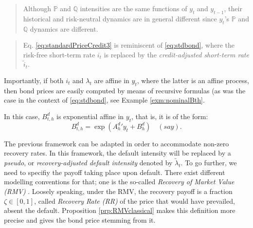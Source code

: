 \documentclass[
  12pt,
]{book}
\theoremstyle{definition}
\theoremstyle{definition}
\theoremstyle{definition}
\theoremstyle{definition}
\theoremstyle{remark}
\begin{document}
\begin{quote}
Although \(\mathbb{P}\) and \(\mathbb{Q}\) intensities are the same functions of \(y_t\) and \(y_{t-1}\), their historical and risk-neutral dynamics are in general different since \(y_t\)'s \(\mathbb{P}\) and \(\mathbb{Q}\) dynamics are different.
\end{quote}

\begin{quote}
Eq. \eqref{eq:standardPriceCredit3} is reminiscent of \eqref{eq:stdbond}, where the risk-free short-term rate \(i_t\) is replaced by the \emph{credit-adjusted short-term rate} \(\tilde{i}_t\).
\end{quote}

Importantly, if both \(i_t\) and \(\lambda_t\) are affine in \(y_t\), where the latter is an affine process, then bond prices are easily computed by means of recursive formulas (as was the case in the context of \eqref{eq:stdbond}, see Example \ref{exm:nominalBth}.

In this case, \(B_{t,h}^d\) is exponential affine in \(y_t\), that is, it is of the form:
\begin{equation}
B_{t,h}^d = \exp({A^d_h}'y_t + B^d_h)\quad (say).\label{eq:standardPriceCredit4}
\end{equation}

The previous framework can be adapted in order to accommodate non-zero recovery rates. In this framework, the default intensity will be replaced by a \emph{pseudo}, or \emph{recovery-adjusted default intensity} denoted by \(\tilde\lambda_t\). To go further, we need to specifiy the payoff taking place upon default. There exist different modelling conventions for that; one is the so-called \emph{Recovery of Market Value (RMV)} \citep{Duffie_Singleton_1999}. Loosely speaking, under the RMV, the recovery payoff is a fraction \(\zeta \in [0,1]\), called \emph{Recovery Rate (RR)} of the price that would have prevailed, absent the default. Proposition \ref{prp:RMVclassical} makes this definition more precise and gives the bond price stemming from it.
\end{document}
